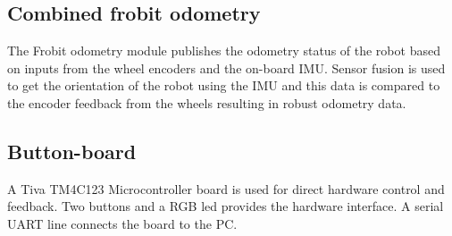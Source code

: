 	\subsection{Combined frobit odometry} %
	\label{sub:mr_combined_frobit_odometry}
	The Frobit odometry module publishes the odometry status of the robot based on inputs from the wheel encoders and the on-board IMU. Sensor fusion is used to get the orientation of the robot using the IMU and this data is compared to the encoder feedback from the wheels resulting in robust odometry data.
	

	\subsection{Button-board} %
	\label{sub:mr_buttons_board}
	A Tiva TM4C123 Microcontroller board is used for direct hardware control and feedback. Two buttons and a RGB led provides the hardware interface. A serial UART line connects the board to the PC.

